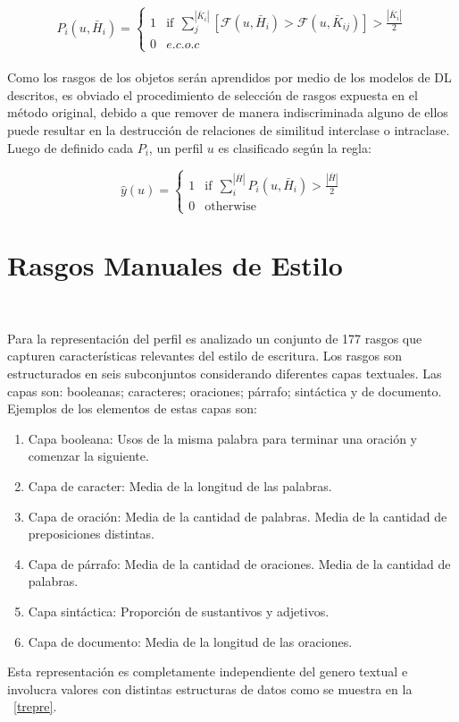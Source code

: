 	\begin{equation*}
	 	P_i(u,  \bar{H}_i) = 
	 	\begin{cases}
	 		1 & \text{if}~~ \sum\limits_{j}^{|\bar{K}_{i}|}[\mathcal{F}(u, \bar{H}_i) > \mathcal{F}(u, \bar{K}_{ij})] > \frac{|\bar{K}_{i}|}{2}\\
	 		0 & e.c.o.c
	 	\end{cases}
	 \end{equation*}	  
	 \\
	 Como los rasgos de los objetos serán aprendidos por medio de los modelos de DL descritos, es obviado el procedimiento de selección de rasgos expuesta en el método original, debido a que remover de manera indiscriminada alguno de ellos puede resultar en la destrucción de relaciones de similitud interclase o intraclase.
	 \\
	 Luego de definido cada $P_i$, un perfil $u$ es clasificado según la regla:
	 
	\begin{equation*}
	 	\hat{y}(u)  = 
	 	\begin{cases}
	 		1 & \text{if}~~ \sum\limits_{i}^{|\bar{H}|} P_i(u, \bar{H}_i) > \frac{|\bar{H}|}{2}\\
	 		0 & \text{otherwise}
	 	\end{cases}
	 \end{equation*}	
	 
	 
	 \section{Rasgos Manuales de Estilo}~\label{syle_feat}
	 
	 Para la representación del perfil es analizado un conjunto de 177 rasgos que capturen características relevantes del estilo de escritura. Los rasgos son estructurados en seis subconjuntos considerando diferentes capas textuales. Las capas son: booleanas; caracteres; oraciones; párrafo; sintáctica y de documento.
	 \\
	 Ejemplos de los elementos de estas capas son:	 \\
	 \begin{enumerate}
	 	\item Capa booleana: Usos de la misma palabra para terminar una oración y comenzar la siguiente.
	 	\item Capa de caracter: Media de la longitud de las palabras.
	 	\item Capa de oración: Media de la cantidad de palabras. Media de la cantidad de preposiciones distintas.
	 	\item Capa de párrafo: Media de la cantidad de oraciones. Media de la cantidad de palabras.
	 	\item Capa sintáctica: Proporción de sustantivos y adjetivos.
	 	\item Capa de documento: Media de la longitud de las oraciones.
	 \end{enumerate}
	 Esta representación es completamente independiente del genero textual e involucra valores con distintas estructuras de datos como se muestra en la \figurename~\ref{trepre}.

